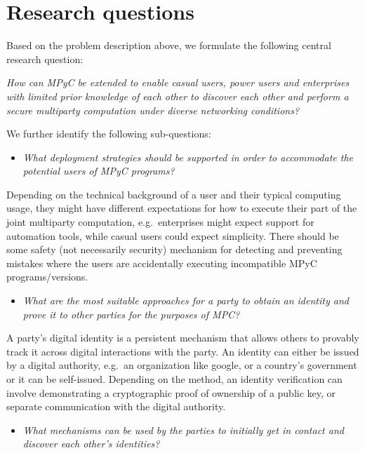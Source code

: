 \hypertarget{research-questions}{%
\section{Research questions}\label{research-questions}}

Based on the problem description above, we formulate the following
central research question:

\emph{How can MPyC be extended to enable casual users, power users and
enterprises with limited prior knowledge of each other to discover each
other and perform a secure multiparty computation under diverse
networking conditions?}

We further identify the following sub-questions:

\begin{itemize}
\tightlist
\item
  \emph{What deployment strategies should be supported in order to
  accommodate the potential users of MPyC programs?}
\end{itemize}

Depending on the technical background of a user and their typical
computing usage, they might have different expectations for how to
execute their part of the joint multiparty computation, e.g.~enterprises
might expect support for automation tools, while casual users could
expect simplicity. There should be some safety (not necessarily
security) mechanism for detecting and preventing mistakes where the
users are accidentally executing incompatible MPyC programs/versions.

\begin{itemize}
\tightlist
\item
  \emph{What are the most suitable approaches for a party to obtain an
  identity and prove it to other parties for the purposes of MPC?}
\end{itemize}

A party's digital identity is a persistent mechanism that allows others
to provably track it across digital interactions with the party. An
identity can either be issued by a digital authority, e.g.~an
organization like google, or a country's government or it can be
self-issued. Depending on the method, an identity verification can
involve demonstrating a cryptographic proof of ownership of a public
key, or separate communication with the digital authority.

\begin{itemize}
\tightlist
\item
  \emph{What mechanisms can be used by the parties to initially get in
  contact and discover each other's identities?}
\end{itemize}

